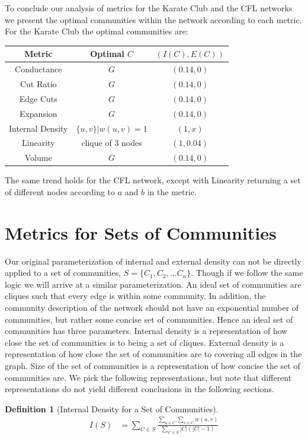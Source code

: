 \documentclass[conference]{IEEEtran}
\newtheorem{definition}{Definition}
\begin{document}
To conclude our analysis of metrics for the Karate Club and the CFL networks we present the optimal communities within the network according to each metric.  For the Karate Club the optimal communities are:
\begin{tabular}{|c | c  c  |}
 \hline Metric & Optimal $C$ & $(I(C), E(C))$ \\ \hline
{\sc Conductance} & $G$& $(0.14, 0)$\\ \hline
{\sc Cut Ratio}  & $G$ & $(0.14, 0)$\\ \hline
{\sc Edge Cuts}  & $G$& $(0.14, 0)$ \\ \hline
{\sc Expansion}  & $G$&$(0.14, 0)$ \\ \hline
{\sc Internal Density}  & $\{u,v\} | w(u,v) = 1$ & $(1, x)$ \\ \hline
{\sc Linearity}  & clique of $3$ nodes & $(1, 0.04)$ \\ \hline
{\sc Volume}  & $G$& $(0.14, 0)$ \\ \hline
\end{tabular}
The same trend holds for the CFL network, except with {\sc Linearity} returning a set of different nodes according to $a$ and $b$ in the metric.

\section{Metrics for Sets of Communities}

Our original parameterization of internal and external density can not be directly applied to a set of communities, $S = \{C_1, C_2, \dots C_n\}$.  Though if we follow the same logic we will arrive at a similar parameterization.  An ideal set of communities are cliques such that every edge is within some community.  In addition, the community description of the network should not have an exponential number of communities, but rather some concise set of communities.  Hence an ideal set of communities has three parameters.  Internal density is a representation of how close the set of communities is to being a set of cliques.  External density is a representation of how close the set of communities are to covering all edges in the graph.  Size of the set of communities is a representation of how concise the set of communities are.  We pick the following representations, but note that different representations do not yield different conclusions in the following sections.

\begin{definition}[Internal Density for  a Set of Communities]
 \begin{align*}
    I(S) &=  \sum_{C \in S} \frac{\sum_{u \in C}\sum_{v \in C} w(u,v)}{\sum_{C \in S} |C|(|C| - 1)}
 \end{align*}
\end{definition}
\end{document}
